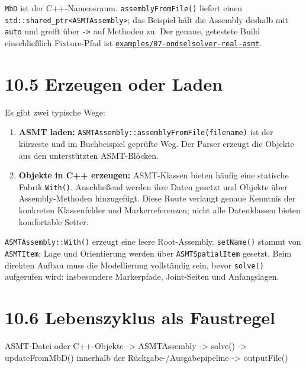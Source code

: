 \documentclass[
  12pt
]{book}
\newenvironment{Shaded}{}{}
\newcommand{\NormalTok}[1]{#1}
\providecommand{\tightlist}{%
  \setlength{\itemsep}{0pt}\setlength{\parskip}{0pt}}
\begin{document}
\texttt{MbD} ist der C++-Namensraum. \texttt{assemblyFromFile()} liefert
einen \texttt{std::shared\_ptr\textless{}ASMTAssembly\textgreater{}};
das Beispiel hält die Assembly deshalb mit \texttt{auto} und greift über
\texttt{-\textgreater{}} auf Methoden zu. Der genaue, getestete Build
einschließlich Fixture-Pfad ist
\href{./examples/07-ondselsolver-real-asmt/README.md}{\texttt{examples/07-ondselsolver-real-asmt}}.

\hypertarget{erzeugen-oder-laden}{%
\section{\texorpdfstring{{10.5} Erzeugen oder
Laden}{10.5 Erzeugen oder Laden}}\label{erzeugen-oder-laden}}

Es gibt zwei typische Wege:

\begin{enumerate}
\def\labelenumi{\arabic{enumi}.}
\tightlist
\item
  \textbf{ASMT laden:} \texttt{ASMTAssembly::assemblyFromFile(filename)}
  ist der kürzeste und im Buchbeispiel geprüfte Weg. Der Parser erzeugt
  die Objekte aus den unterstützten ASMT-Blöcken.
\item
  \textbf{Objekte in C++ erzeugen:} ASMT-Klassen bieten häufig eine
  statische Fabrik \texttt{With()}. Anschließend werden ihre Daten
  gesetzt und Objekte über Assembly-Methoden hinzugefügt. Diese Route
  verlangt genaue Kenntnis der konkreten Klassenfelder und
  Markerreferenzen; nicht alle Datenklassen bieten komfortable Setter.
\end{enumerate}

\texttt{ASMTAssembly::With()} erzeugt eine leere Root-Assembly.
\texttt{setName()} stammt von \texttt{ASMTItem}; Lage und Orientierung
werden über \texttt{ASMTSpatialItem} gesetzt. Beim direkten Aufbau muss
die Modellierung vollständig sein, bevor \texttt{solve()} aufgerufen
wird: insbesondere Markerpfade, Joint-Seiten und Anfangslagen.

\hypertarget{lebenszyklus-als-faustregel}{%
\section{\texorpdfstring{{10.6} Lebenszyklus als
Faustregel}{10.6 Lebenszyklus als Faustregel}}\label{lebenszyklus-als-faustregel}}

\begin{Shaded}
\begin{Highlighting}[]
\NormalTok{ASMT{-}Datei oder C++{-}Objekte}
\NormalTok{    {-}\textgreater{} ASMTAssembly}
\NormalTok{    {-}\textgreater{} solve()}
\NormalTok{    {-}\textgreater{} updateFromMbD() innerhalb der Rückgabe{-}/Ausgabepipeline}
\NormalTok{    {-}\textgreater{} outputFile()}
\end{Highlighting}
\end{Shaded}
\end{document}
